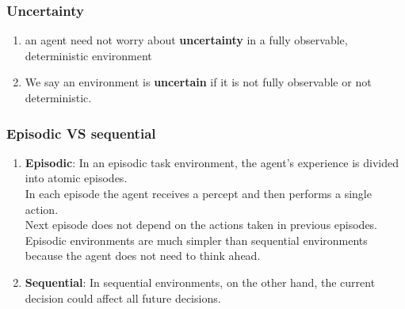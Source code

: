\subsubsection{Uncertainty}
\begin{enumerate}
    \item an agent need not worry about \textbf{uncertainty} in a fully observable, deterministic environment

    \item We say an environment is \textbf{uncertain} if it is not fully observable or not deterministic.
\end{enumerate}


\subsubsection{Episodic VS sequential}

\begin{enumerate}
    \item \textbf{Episodic}: In an episodic task environment, the agent’s experience is divided into atomic episodes.\\
    In each episode the agent receives a percept and then performs a single action.\\
    Next episode does not depend on the actions taken in previous episodes.\\
    Episodic environments are much simpler than sequential environments because the agent does not need to think ahead.

    \item \textbf{Sequential}: In sequential environments, on the other hand, the current decision could affect all future decisions.
\end{enumerate}


